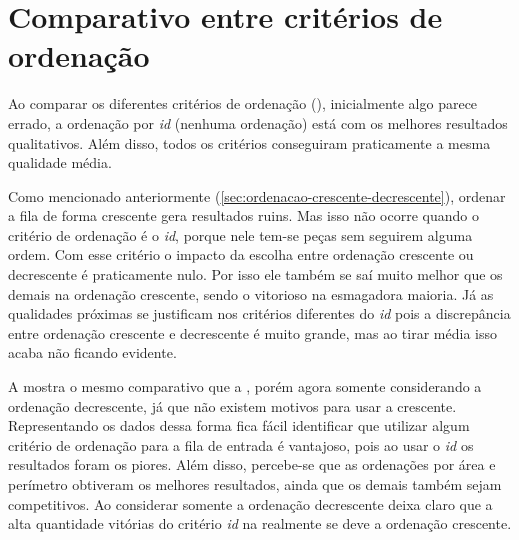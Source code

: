 \section{Comparativo entre critérios de ordenação}\label{sec:comparativo-entre-criterios-de-ordenacao}

Ao comparar os diferentes critérios de ordenação (), inicialmente algo parece
errado, a ordenação por \textit{id} (nenhuma ordenação) está com os melhores resultados
qualitativos.
Além disso, todos os critérios conseguiram praticamente a mesma qualidade média.



Como mencionado anteriormente (\cref{sec:ordenacao-crescente-decrescente}), ordenar a fila de
forma crescente gera resultados ruins.
Mas isso não ocorre quando o critério de ordenação é o \textit{id}, porque nele tem-se peças
sem seguirem alguma ordem.
Com esse critério o impacto da escolha entre ordenação crescente ou decrescente é praticamente
nulo.
Por isso ele também se saí muito melhor que os demais na ordenação crescente, sendo o vitorioso
na esmagadora maioria.
Já as qualidades próximas se justificam nos critérios diferentes do \textit{id} pois a
discrepância entre ordenação crescente e decrescente é muito grande, mas ao tirar média isso acaba
não ficando evidente.

A  mostra o mesmo comparativo que a , porém agora
somente considerando a ordenação decrescente, já que não existem motivos para usar a crescente.
Representando os dados dessa forma fica fácil identificar que utilizar algum critério de ordenação
para a fila de entrada é vantajoso, pois ao usar o \textit{id} os resultados foram os piores.
Além disso, percebe-se que as ordenações por área e perímetro obtiveram os melhores resultados,
ainda que os demais também sejam competitivos.
Ao considerar somente a ordenação decrescente deixa claro que a alta quantidade vitórias do critério
\textit{id} na  realmente se deve a ordenação crescente.

